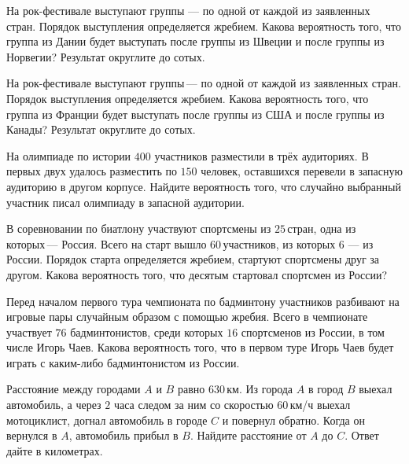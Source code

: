 \begin{class}[number=9]
\begin{listofex}
\begin{minipage}[t]{\picwidth}
		\end{minipage}
		\item На рок-фестивале выступают группы --- по одной от каждой из заявленных стран. Порядок выступления определяется жребием. Какова вероятность того, что группа из Дании будет выступать после группы из Швеции и после группы из Норвегии? Результат округлите до сотых.
		\item На рок-фестивале выступают группы --- по одной от каждой из заявленных стран. Порядок выступления определяется жребием. Какова вероятность того, что группа из Франции будет выступать после группы из США и после группы из Канады? Результат округлите до сотых.
		\item На олимпиаде по истории \( 400 \) участников разместили в трёх аудиториях. В первых двух удалось разместить по \( 150 \) человек, оставшихся перевели в запасную аудиторию в другом корпусе. Найдите вероятность того, что случайно выбранный участник писал олимпиаду в запасной аудитории.
		\item В соревновании по биатлону участвуют спортсмены из \( 25 \) стран, одна из которых --- Россия. Всего на старт вышло \( 60 \) участников, из которых \( 6 \) --- из России. Порядок старта определяется жребием, стартуют спортсмены друг за другом. Какова вероятность того, что десятым стартовал спортсмен из России?
		\item Перед началом первого тура чемпионата по бадминтону участников разбивают на игровые пары случайным образом с помощью жребия. Всего в чемпионате участвует \( 76 \) бадминтонистов, среди которых \( 16 \) спортсменов из России, в том числе Игорь Чаев. Какова вероятность того, что в первом туре Игорь Чаев будет играть с каким-либо бадминтонистом из России.
		\item Расстояние между городами \( A \) и \( B \) равно \( 630 \) км. Из города \( A \) в город \( B \) выехал автомобиль, а через \( 2 \) часа следом за ним со скоростью \( 60 \) км/ч выехал мотоциклист, догнал автомобиль в городе \( C \) и повернул обратно. Когда он вернулся в \( A \), автомобиль прибыл в \( B \). Найдите расстояние от \( A \) до \( C \). Ответ дайте в километрах.
	\end{listofex}
\end{class}

